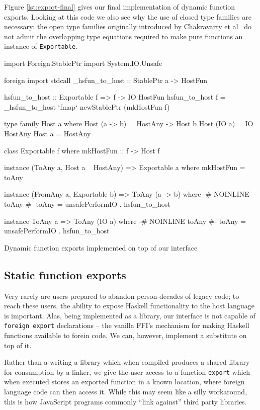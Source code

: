 \documentclass{sigplanconf}
\begin{document}
Figure \ref{lst:export-final} gives our final implementation of dynamic
function exports.
Looking at this code we also see why the use of closed type families are
necessary: the open type families originally introduced by Chakravarty et
al\ \cite{typefamilies} do not admit the overlapping type equations required
to make pure functions an instance of \lstinline!Exportable!.

\begin{listingfloat}[H]
\begin{code}
import Foreign.StablePtr
import System.IO.Unsafe

foreign import stdcall
  _hsfun_to_host :: StablePtr a -> HostFun

hsfun_to_host :: Exportable f => f -> IO HostFun
hsfun_to_host f =
  _hsfun_to_host `fmap` newStablePtr (mkHostFun f)

type family Host a where
  Host (a -> b) = HostAny -> Host b
  Host (IO a)   = IO HostAny
  Host a        = HostAny

class Exportable f where
  mkHostFun :: f -> Host f

instance (ToAny a, Host a ~ HostAny) =>
          Exportable a where
  mkHostFun = toAny

instance (FromAny a, Exportable b) =>
          ToAny (a -> b) where
  {-# NOINLINE toAny #-}
  toAny = unsafePerformIO . hsfun_to_host

instance ToAny a => ToAny (IO a) where
  {-# NOINLINE toAny #-}
  toAny = unsafePerformIO . hsfun_to_host
\end{code}
\caption{Dynamic function exports implemented on top of our interface}
\label{lst:export-final}
\end{listingfloat}

\subsection{Static function exports}
\label{sec:exports}
Very rarely are users prepared to abandon person-decades of legacy code;
to reach these users, the ability to expose Haskell functionality to the host
language is important. Alas, being implemented as a library, our interface is
not capable of \lstinline!foreign export! declarations -- the vanilla FFI's
mechanism for making Haskell functions available to forein code. We can, however,
implement a substitute on top of it.

Rather than a writing a library which when compiled produces a shared library
for consumption by a linker, we give the user access to a function
\lstinline!export! which when executed stores an exported function in a
known location, where foreign language code can then access it.
While this may seem like a silly workaround, this is how JavaScript programs
commonly ``link against'' third party libraries.
\end{document}
